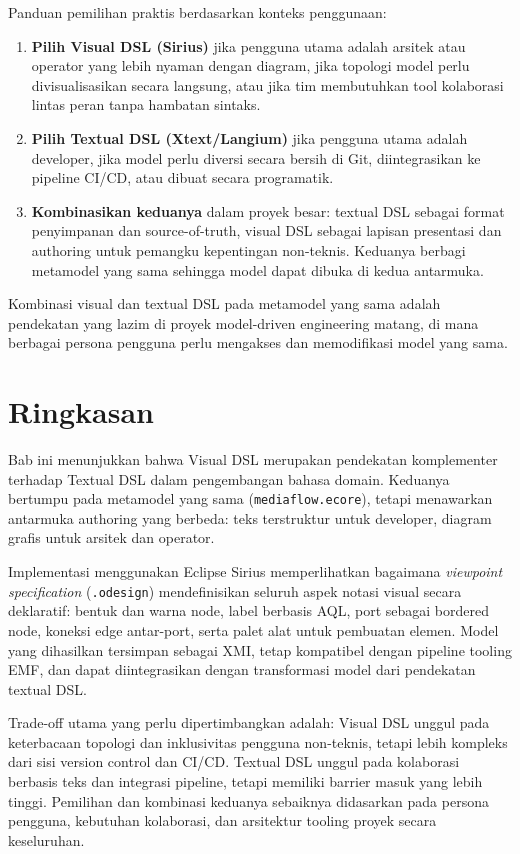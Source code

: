 Panduan pemilihan praktis berdasarkan konteks penggunaan:
\begin{enumerate}
  \item \textbf{Pilih Visual DSL (Sirius)} jika pengguna utama adalah arsitek atau operator yang lebih nyaman dengan diagram, jika topologi model perlu divisualisasikan secara langsung, atau jika tim membutuhkan tool kolaborasi lintas peran tanpa hambatan sintaks.
  \item \textbf{Pilih Textual DSL (Xtext/Langium)} jika pengguna utama adalah developer, jika model perlu diversi secara bersih di Git, diintegrasikan ke pipeline CI/CD, atau dibuat secara programatik.
  \item \textbf{Kombinasikan keduanya} dalam proyek besar: textual DSL sebagai format penyimpanan dan source-of-truth, visual DSL sebagai lapisan presentasi dan authoring untuk pemangku kepentingan non-teknis. Keduanya berbagi metamodel yang sama sehingga model dapat dibuka di kedua antarmuka.
\end{enumerate}

Kombinasi visual dan textual DSL pada metamodel yang sama adalah pendekatan yang lazim di proyek model-driven engineering matang, di mana berbagai persona pengguna perlu mengakses dan memodifikasi model yang sama.

\section{Ringkasan}

Bab ini menunjukkan bahwa Visual DSL merupakan pendekatan komplementer terhadap Textual DSL dalam pengembangan bahasa domain. Keduanya bertumpu pada metamodel yang sama (\texttt{mediaflow.ecore}), tetapi menawarkan antarmuka authoring yang berbeda: teks terstruktur untuk developer, diagram grafis untuk arsitek dan operator.

Implementasi menggunakan Eclipse Sirius memperlihatkan bagaimana \textit{viewpoint specification} (\texttt{.odesign}) mendefinisikan seluruh aspek notasi visual secara deklaratif: bentuk dan warna node, label berbasis AQL, port sebagai bordered node, koneksi edge antar-port, serta palet alat untuk pembuatan elemen. Model yang dihasilkan tersimpan sebagai XMI, tetap kompatibel dengan pipeline tooling EMF, dan dapat diintegrasikan dengan transformasi model dari pendekatan textual DSL.

Trade-off utama yang perlu dipertimbangkan adalah: Visual DSL unggul pada keterbacaan topologi dan inklusivitas pengguna non-teknis, tetapi lebih kompleks dari sisi version control dan CI/CD. Textual DSL unggul pada kolaborasi berbasis teks dan integrasi pipeline, tetapi memiliki barrier masuk yang lebih tinggi. Pemilihan dan kombinasi keduanya sebaiknya didasarkan pada persona pengguna, kebutuhan kolaborasi, dan arsitektur tooling proyek secara keseluruhan.


